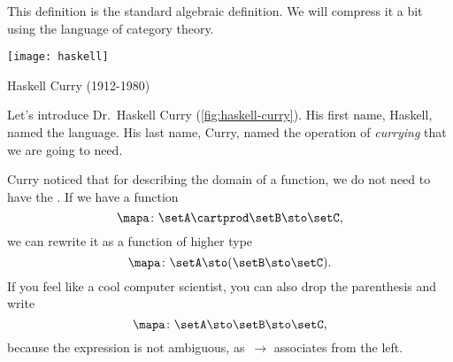 This definition is the standard algebraic definition.
We will compress it a bit using the language of category theory.

\begin{marginfigure}
    \texttt{[image: haskell]}
    \caption{Haskell Curry (1912-1980)}
    \label{fig:haskell-curry}
\end{marginfigure}

Let's introduce Dr.~Haskell Curry (\cref{fig:haskell-curry}).
His first name, Haskell, named the language.
His last name, Curry, named the operation of \emph{currying} that we are going to need.

Curry noticed that for describing the domain of a function, we do not need to have the .
If we have a function
%
\begin{equation}
    \label{eq:currying-1}
    \mapa \colon \setA \cartprod \setB \sto \setC,
\end{equation}
%
we can rewrite it as a function of higher type
%
\begin{equation}
    \label{eq:currying-2}
    \mapa \colon \setA \sto ( \setB \sto \setC).
\end{equation}
%
If you feel like a cool computer scientist, you can also drop the parenthesis and write
%
\begin{equation}
    \label{eq:currying-3}
    \mapa \colon \setA \sto \setB \sto \setC,
\end{equation}
%
because the expression is not ambiguous, as~$\to$ associates from the left.


